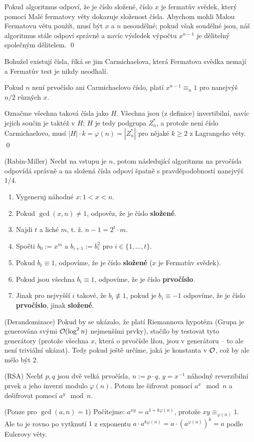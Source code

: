 \dk Pokud algoritmus odpoví, že je číslo složené, číslo $x$ je fermatův svědek,
který pomocí Malé fermatovy věty dokazuje složenost čísla. Abychom mohli Malou
Fermatovu větu použít, musí být $x$ a $n$ nesoudělné; pokud však soudělné jsou,
náš algoritmus stále odpoví správně a navíc výsledek výpočtu $x^{n-1}$ je
dělitelný společným dělitelem. \qed

\poz Bohužel existují čísla, říká se jim Carmichaelova, která Fermatova svědka
nemají a Fermatův test je nikdy neodhalí.

\vt Pokud $n$ není prvočíslo ani Carmichaelovo číslo, platí $x^{n-1} \equiv_n
1$ pro nanejvýš $n/2$ různých $x$.

\dk Označme všechna taková čísla jako $H$. Všechna jsou (z definice)
invertibilní, navíc jejich součin je taktéž v $H$; $H$ je tedy podgrupa $Z_n^*$,
a protože není číslo Carmichaelovo, musí $|H| \cdot k = \varphi(n) = |Z_n^*|$
pro nějaké $k \geq 2$ z Lagrangeho věty. \qed

\alg (Rabin-Miller) Nechť na vstupu je $n$, potom následující algoritmus na
prvočísla odpovídá správně a na složená čísla odpoví špatně s pravděpodobností
nanejvýš $1/4$.
\begin{enumerate}
	\item Vygeneruj náhodné $x: 1 < x < n$.
	\item Pokud $\gcd(x,n) \neq 1$, odpověz, že je číslo {\bf složené}.
	\item Najdi $t$ a liché $m$, t. ž. $n-1 = 2^t \cdot m$.
	\item Spočti $b_0 := x^m$ a $b_{i+1} := b_i^2$ pro $i\in \{1, \dots, t\}$.
	\item Pokud $b_t \equiv 1$, odpovíme, že je číslo {\bf složené} ($x$ je
		Fermatův svědek).
	\item Pokud jsou všechna $b_i \equiv 1$, odpovíme, že je číslo {\bf
		prvočíslo}.
	\item Jinak pro nejvyšší $i$ takové, že $b_i \not\equiv 1$, pokud je $b_i
		\equiv -1$ odpovíme, že je číslo {\bf prvočíslo}, jinak {\bf složené}.
\end{enumerate}

\pzn (Derandomizace) Pokud by se ukázalo, že platí Riemannova hypotéza (Grupa je
generována svými $\mathcal{O}(\log^2 n)$ nejmenšími prvky), stačilo by testovat tyto
generátory (protože všechna $x$, která o prvočísle lžou, jsou v generátoru -- to
ale není triviální ukázat). Tedy pokud ještě určíme, jaká je konstanta v $\mathcal{O}$,
což by ale mělo být $2$.

\alg (RSA) Nechť $p,q$ jsou dvě velká prvočísla, $n := p \cdot q$, $y = x^{-1}$
náhodný reverzibilní prvek a jeho inverzi modulo $\varphi(n)$. Potom lze
šifrovat pomocí $a^x \mod n$ a dešifrovat pomocí $a^y \mod n$.

\dk (Pouze pro $\gcd(a,n) = 1$) Počítejme: $a^{xy} = a^{1 + k\varphi(n)}$,
protože $xy \equiv_{\varphi(n)} 1$. Ale to je rovno po vytknutí $1$ z exponentu
$a \cdot a^{k\varphi(n)} = a \cdot (a^{\varphi(n)})^k = a$ podle Eulerovy věty.

